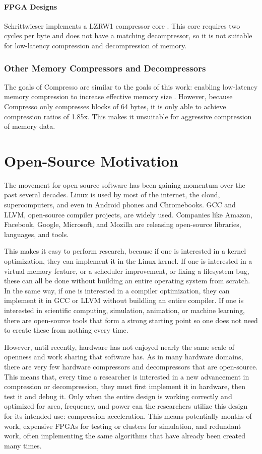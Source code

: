 \documentclass[doublespace,nopageskip]{VTthesis}
\begin{document}
\subsubsection{FPGA Designs}\label{sss:open_fpga_compressor_designs}
Schrittwieser implements a LZRW1 compressor core \cite{lzrw1}. This core requires two cycles per byte and does not have a matching decompressor, so it is not suitable for low-latency compression and decompression of memory.

\subsection{Other Memory Compressors and Decompressors}\label{ss:other_memory_compressors_and_decompressors}
The goals of Compresso are similar to the goals of this work: enabling low-latency memory compression to increase effective memory size \cite{compresso}. However, because Compresso only compresses blocks of 64 bytes, it is only able to achieve compression ratios of 1.85x. This makes it unsuitable for aggressive compression of memory data.

\chapter{Open-Source Motivation}\label{ch:open-source_motivation}
The movement for open-source software has been gaining momentum over the past several decades. Linux is used by most of the internet, the cloud, supercomputers, and even in Android phones and Chromebooks. GCC and LLVM, open-source compiler projects, are widely used. Companies like Amazon, Facebook, Google, Microsoft, and Mozilla are releasing open-source libraries, languages, and tools.

This makes it easy to perform research, because if one is interested in a kernel optimization, they can implement it in the Linux kernel. If one is interested in a virtual memory feature, or a scheduler improvement, or fixing a filesystem bug, these can all be done without building an entire operating system from scratch. In the same way, if one is interested in a compiler optimization, they can implement it in GCC or LLVM without buildling an entire compiler. If one is interested in scientific computing, simulation, animation, or machine learning, there are open-source tools that form a strong starting point so one does not need to create these from nothing every time.

However, until recently, hardware has not enjoyed nearly the same scale of openness and work sharing that software has. As in many hardware domains, there are very few hardware compressors and decompressors that are open-source. This means that, every time a researcher is interested in a new advancement in compression or decompression, they must first implement it in hardware, then test it and debug it. Only when the entire design is working correctly and optimized for area, frequency, and power can the researchers utilize this design for its intended use: compression acceleration. This means potentially months of work, expensive FPGAs for testing or clusters for simulation, and redundant work, often implementing the same algorithms that have already been created many times.
\end{document}
